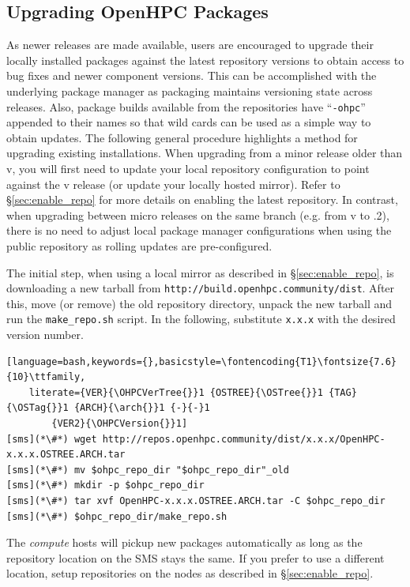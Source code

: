 \subsection{Upgrading OpenHPC Packages}  \label{appendix:upgrade}


As newer \OHPC{} releases are made available, users are encouraged to upgrade
their locally installed packages against the latest repository versions to
obtain access to bug fixes and newer component versions. This can be
accomplished with the underlying package manager as \OHPC{} packaging maintains
versioning state across releases. Also, package builds available from the
\OHPC{} repositories have ``\texttt{-ohpc}'' appended to their names so that
wild cards can be used as a simple way to obtain updates. The following general
procedure highlights a method for upgrading existing installations.
When upgrading from a minor release older than v\OHPCVerTree{}, you will first
need to update your local \OHPC{} repository configuration to point against the
v\OHPCVerTree{} release (or update your locally hosted mirror). Refer to
\S\ref{sec:enable_repo} for more details on enabling the latest
repository. In contrast, when upgrading between micro releases on the same
branch (e.g. from v\OHPCVerTree{} to \OHPCVerTree{}.2), there is no need to
adjust local package manager configurations when using the public repository as
rolling updates are pre-configured.

The initial step, when using a local mirror as described in
\S\ref{sec:enable_repo}, is downloading a new tarball from \texttt{http://build.openhpc.community/dist}.
After this, move (or remove) the old repository directory, unpack
the new tarball and run the \texttt{make\_repo.sh} script. In the following,
substitute \texttt{x.x.x} with the desired version number.

\begin{lstlisting}[language=bash,keywords={},basicstyle=\fontencoding{T1}\fontsize{7.6}{10}\ttfamily,
	literate={VER}{\OHPCVerTree{}}1 {OSTREE}{\OSTree{}}1 {TAG}{\OSTag{}}1 {ARCH}{\arch{}}1 {-}{-}1
        {VER2}{\OHPCVersion{}}1]
[sms](*\#*) wget http://repos.openhpc.community/dist/x.x.x/OpenHPC-x.x.x.OSTREE.ARCH.tar
[sms](*\#*) mv $ohpc_repo_dir "$ohpc_repo_dir"_old
[sms](*\#*) mkdir -p $ohpc_repo_dir
[sms](*\#*) tar xvf OpenHPC-x.x.x.OSTREE.ARCH.tar -C $ohpc_repo_dir
[sms](*\#*) $ohpc_repo_dir/make_repo.sh
\end{lstlisting}

The {\em compute} hosts will pickup new packages automatically as long as the
repository location on the SMS stays the same. If you prefer to use a different
location, setup repositories on the nodes as described in
\S\ref{sec:enable_repo}.

